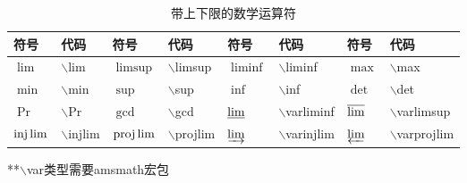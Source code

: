\documentclass[UTF8,fontset=ubuntu]{ctexart}
\begin{document}
\begin{table}
\begin{tabular}{l l l l l l l l}
	\hline
	符号 & 代码 & 符号 & 代码 & 符号 & 代码 & 符号 & 代码\\
	\hline
	$\lim$ & $\backslash$lim & $\limsup$ & $\backslash$limsup & $\liminf$ & $\backslash$liminf & $\max$ & $\backslash$max\\
	$\min$ & $\backslash$min & $\sup$ & $\backslash$sup & $\inf$ & $\backslash$inf & $\det$ & $\backslash$det\\
	$\Pr$ & $\backslash$Pr & $\gcd$ & $\backslash$gcd & $\varliminf$ & $\backslash$varliminf & $\varlimsup$ & $\backslash$varlimsup\\
	$\injlim$ & $\backslash$injlim & $\projlim$ & $\backslash$projlim & $\varinjlim$ & $\backslash$varinjlim & $\varprojlim$ & $\backslash$varprojlim\\
	\hline
\end{tabular}
**$\backslash$var类型需要amsmath宏包
\caption{带上下限的数学运算符}
\end{table}
\end{document}
